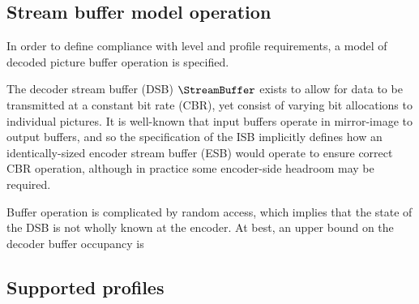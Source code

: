 \subsection{Stream buffer model operation}
\label{streambufferop}

In order to define compliance with level and profile requirements, a model of decoded picture buffer
operation is specified.

The decoder stream buffer (DSB) $\StreamBuffer$ exists to allow for data to be transmitted at a constant bit
rate (CBR), yet consist of varying bit allocations to individual pictures. It is well-known that input buffers
operate in mirror-image to output buffers, and so the specification of the ISB implicitly defines
how an identically-sized encoder stream buffer (ESB) would operate to ensure correct CBR operation, although
in practice some encoder-side headroom may be required.

Buffer operation is complicated by random access, which implies that the state of the DSB is not
wholly known at the encoder. At best, an upper bound on the decoder buffer occupancy is  
 

\subsection{Supported profiles}